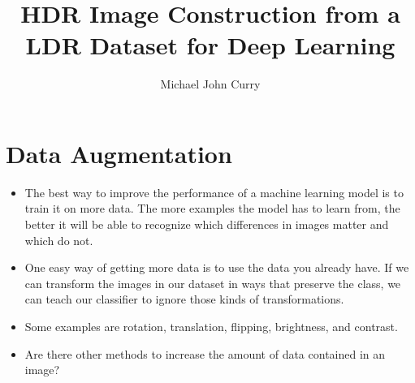 \documentclass{beamer}
\author{Michael John Curry}
\title{HDR Image Construction from a LDR Dataset for Deep Learning}
\institute{SUNY New Paltz}
\begin{document}
	\begin{frame}
    \titlepage
    \end{frame}

	
	\begin{frame}
		\tableofcontents[sectionstyle=show,subsectionstyle=show/shaded/hide,subsubsectionstyle=show/shaded/hide]
	\end{frame}
	
	\section{Data Augmentation}
		    \begin{frame}
			    \begin{itemize} 
			    \item 
			    The best way to improve the performance of a machine learning model is to train it on more data. The more examples the model has to learn from, the better it will be able to recognize which differences in images matter and which do not.
                \end{itemize}
                \begin{itemize}
                \item 
			    One easy way of getting more data is to use the data you already have. If we can transform the images in our dataset in ways that preserve the class, we can teach our classifier to ignore those kinds of transformations.  
                \end{itemize}
                 \begin{itemize}
                \item 
			    Some examples are rotation, translation, flipping, brightness, and contrast. 
                \end{itemize}
		    \end{frame}
		    
		    \begin{frame}
		        \begin{itemize}
		        \item 
		        Are there other methods to increase the amount of data contained in an image? 
		        \end{itemize}
		    \end{frame}
	
\end{document}
